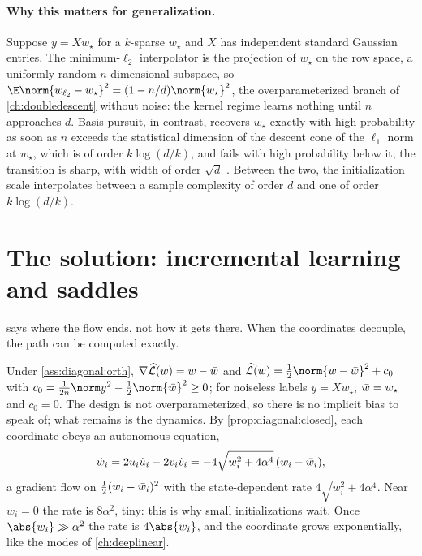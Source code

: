 \begin{refsection}
\paragraph{Why this matters for generalization.} Suppose $y=Xw_\star$ for a $k$-sparse $w_\star$ and $X$ has independent standard Gaussian entries. The minimum-$\ell_2$ interpolator is the projection of $w_\star$ on the row space, a uniformly random $n$-dimensional subspace, so $\E\norm{\diagwl2-w_\star}^2=(1-n/d)\norm{w_\star}^2$, the overparameterized branch of \cref{ch:doubledescent} without noise: the kernel regime learns nothing until $n$ approaches $d$. Basis pursuit, in contrast, recovers $w_\star$ exactly with high probability as soon as $n$ exceeds the statistical dimension of the descent cone of the $\ell_1$ norm at $w_\star$, which is of order $k\log(d/k)$, and fails with high probability below it; the transition is sharp, with width of order $\sqrt d$ \parencite{AmelunxenEtAl2014}. Between the two, the initialization scale interpolates between a sample complexity of order $d$ and one of order $k\log(d/k)$.

\section{The solution: incremental learning and saddles}\label{sec:diagonal:dynamics}

 says where the flow ends, not how it gets there. When the coordinates decouple, the path can be computed exactly.


Under \cref{ass:diagonal:orth}, $\nabla\widehat{\mathcal{L}}(w)=w-\bar w$ and $\Lhat(w)=\frac12\norm{w-\diagbar}^2+c_0$ with $c_0=\frac1{2n}\norm y^2-\frac12\norm{\diagbar}^2\ge0$; for noiseless labels $y=Xw_\star$, $\bar w=w_\star$ and $c_0=0$. The design is not overparameterized, so there is no implicit bias to speak of; what remains is the dynamics. By \cref{prop:diagonal:closed}, each coordinate obeys an autonomous equation,
\begin{equation}\label{eq:diagonal:coord}
  \dot w_i=2u_i\dot u_i-2v_i\dot v_i=-4\sqrt{w_i^2+4\alpha^4}\,(w_i-\bar w_i),
\end{equation}
a gradient flow on $\frac12(w_i-\bar w_i)^2$ with the state-dependent rate $4\sqrt{w_i^2+4\alpha^4}$. Near $w_i=0$ the rate is $8\alpha^2$, tiny: this is why small initializations wait. Once $\abs{w_i}\gg\alpha^2$ the rate is $4\abs{w_i}$, and the coordinate grows exponentially, like the modes of \cref{ch:deeplinear}.


\end{refsection}
